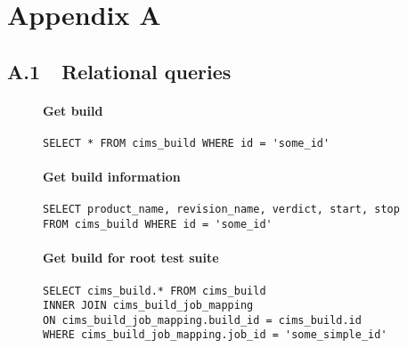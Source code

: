 \appendix
\chapter*{Appendix A}
\label{appendix1}
\section*{A.1\ \ Relational queries}
\label{relationalqueries}

\begin{figure}[H]
\subsubsection*{Get build}
\begin{mdframed}
\label{q:getbuild}
\begin{verbatim}
SELECT * FROM cims_build WHERE id = 'some_id'
\end{verbatim}
\label{code:get_build}
\end{mdframed}
\end{figure}

\begin{figure}[H]
\subsubsection*{Get build information}
\begin{mdframed}
\label{q:getbuild}
\begin{verbatim}
SELECT product_name, revision_name, verdict, start, stop
FROM cims_build WHERE id = 'some_id'
\end{verbatim}
\label{code:get_buildinfo}
\end{mdframed}
\end{figure}

\begin{figure}[H]
\subsubsection*{Get build for root test suite}
\label{q:getbuildforroot}
\begin{mdframed}
\begin{verbatim}
SELECT cims_build.* FROM cims_build
INNER JOIN cims_build_job_mapping
ON cims_build_job_mapping.build_id = cims_build.id   
WHERE cims_build_job_mapping.job_id = 'some_simple_id'
\end{verbatim} 
\end{mdframed}
\end{figure}

